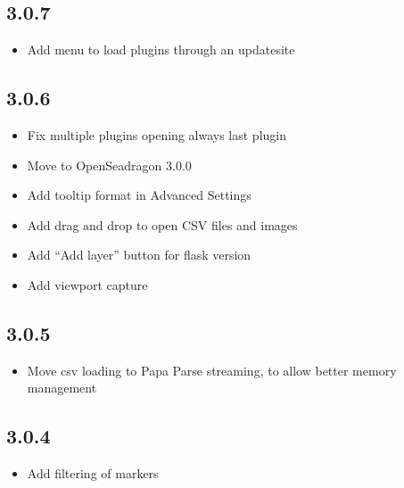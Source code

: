 \documentclass[letterpaper,10pt,english,openany,oneside]{sphinxmanual}
\begin{document}
\subsection{3.0.7}
\label{\detokenize{docs/intro/versions:id10}}\begin{itemize}
\item {} 
\sphinxAtStartPar
Add menu to load plugins through an update\sphinxhyphen{}site

\end{itemize}


\subsection{3.0.6}
\label{\detokenize{docs/intro/versions:id11}}\begin{itemize}
\item {} 
\sphinxAtStartPar
Fix multiple plugins opening always last plugin

\item {} 
\sphinxAtStartPar
Move to OpenSeadragon 3.0.0

\item {} 
\sphinxAtStartPar
Add tooltip format in Advanced Settings

\item {} 
\sphinxAtStartPar
Add drag and drop to open CSV files and images

\item {} 
\sphinxAtStartPar
Add “Add layer” button for flask version

\item {} 
\sphinxAtStartPar
Add viewport capture

\end{itemize}


\subsection{3.0.5}
\label{\detokenize{docs/intro/versions:id12}}\begin{itemize}
\item {} 
\sphinxAtStartPar
Move csv loading to Papa Parse streaming, to allow better memory management

\end{itemize}


\subsection{3.0.4}
\label{\detokenize{docs/intro/versions:id13}}\begin{itemize}
\item {} 
\sphinxAtStartPar
Add filtering of markers

\end{itemize}
\end{document}
